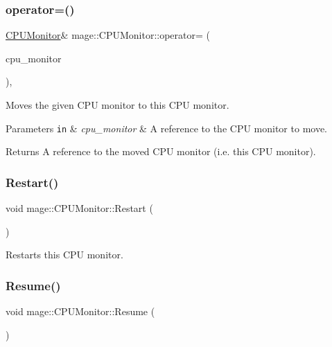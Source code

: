 \subsubsection{\texorpdfstring{operator=()}{operator=()}\hspace{0.1cm}{\footnotesize\ttfamily [2/2]}}
{\footnotesize\ttfamily \mbox{\hyperlink{classmage_1_1_c_p_u_monitor}{C\+P\+U\+Monitor}}\& mage\+::\+C\+P\+U\+Monitor\+::operator= (\begin{DoxyParamCaption}\item[{\mbox{\hyperlink{classmage_1_1_c_p_u_monitor}{C\+P\+U\+Monitor}} \&\&}]{cpu\+\_\+monitor }\end{DoxyParamCaption})\hspace{0.3cm}{\ttfamily [default]}, {\ttfamily [noexcept]}}

Moves the given C\+PU monitor to this C\+PU monitor.


\begin{DoxyParams}[1]{Parameters}
\mbox{\tt in}  & {\em cpu\+\_\+monitor} & A reference to the C\+PU monitor to move. \\
\hline
\end{DoxyParams}
\begin{DoxyReturn}{Returns}
A reference to the moved C\+PU monitor (i.\+e. this C\+PU monitor). 
\end{DoxyReturn}
\mbox{\label{classmage_1_1_c_p_u_monitor_ab8b04a64545df631be0f40a54cc49e03}} 
\subsubsection{\texorpdfstring{Restart()}{Restart()}}
{\footnotesize\ttfamily void mage\+::\+C\+P\+U\+Monitor\+::\+Restart (\begin{DoxyParamCaption}{ }\end{DoxyParamCaption})\hspace{0.3cm}{\ttfamily [noexcept]}}

Restarts this C\+PU monitor. \mbox{\label{classmage_1_1_c_p_u_monitor_a5fd594262dc1073da564955c58851760}} 
\subsubsection{\texorpdfstring{Resume()}{Resume()}}
{\footnotesize\ttfamily void mage\+::\+C\+P\+U\+Monitor\+::\+Resume (\begin{DoxyParamCaption}{ }\end{DoxyParamCaption})\hspace{0.3cm}{\ttfamily [noexcept]}}

